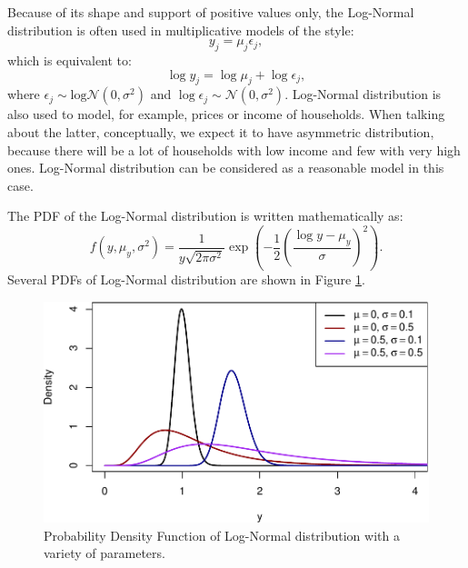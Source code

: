 \documentclass[
]{book}
\theoremstyle{definition}
\theoremstyle{definition}
\theoremstyle{definition}
\theoremstyle{definition}
\theoremstyle{remark}
\begin{document}
Because of its shape and support of positive values only, the Log-Normal distribution is often used in multiplicative models of the style:
\begin{equation}
    y_j = \mu_j \epsilon_j ,
    \label{eq:LogNormalModel}
\end{equation}
which is equivalent to:
\begin{equation}
    \log y_j = \log \mu_j + \log \epsilon_j ,
    \label{eq:LogNormalModelLogs}
\end{equation}
where \(\epsilon_j \sim \mathrm{log}\mathcal{N}(0, \sigma^2)\) and \(\log \epsilon_j \sim \mathcal{N}(0, \sigma^2)\). Log-Normal distribution is also used to model, for example, prices or income of households. When talking about the latter, conceptually, we expect it to have asymmetric distribution, because there will be a lot of households with low income and few with very high ones. Log-Normal distribution can be considered as a reasonable model in this case.

The PDF of the Log-Normal distribution is written mathematically as:
\begin{equation}
    f(y, \mu_y, \sigma^2) = \frac{1}{y \sqrt{2 \pi \sigma^2}} \exp \left( -\frac{1}{2} \left(\frac{\log y - \mu_y}{\sigma}\right)^2 \right) .
    \label{eq:LogNormalPDF}
\end{equation}
Several PDFs of Log-Normal distribution are shown in Figure \ref{fig:dlnormPlot}.

\begin{figure}
\centering
\includegraphics{Svetunkov---Statistics-for-Business-Analytics_files/figure-latex/dlnormPlot-1.pdf}
\caption{\label{fig:dlnormPlot}Probability Density Function of Log-Normal distribution with a variety of parameters.}
\end{figure}
\end{document}
